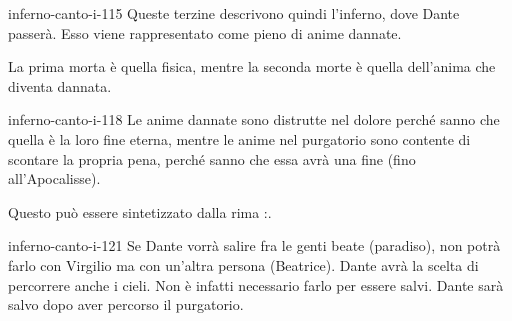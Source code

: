 \documentclass[preview]{standalone}
\begin{document}
\begin{snippet}{inferno-canto-i-115}
    Queste terzine descrivono quindi l'inferno, dove Dante passerà.
    Esso viene rappresentato come pieno di anime dannate.
    
    La prima morta è quella fisica, mentre la seconda morte è quella dell'anima che
    diventa dannata.
\end{snippet}

\begin{snippet}{inferno-canto-i-118}
    Le anime dannate sono distrutte nel dolore perché sanno che quella è la loro
    fine eterna, mentre le anime nel purgatorio sono contente di scontare la propria pena,
    perché sanno che essa avrà una fine (fino all'Apocalisse).

    Questo può essere sintetizzato dalla rima :.
\end{snippet}    

\begin{snippet}{inferno-canto-i-121}
    Se Dante vorrà salire fra le genti beate (paradiso), non potrà farlo con Virgilio
    ma con un'altra persona (Beatrice).
    Dante avrà la scelta di percorrere anche i cieli. Non è infatti necessario
    farlo per essere salvi. Dante sarà salvo dopo aver percorso il purgatorio.
\end{snippet}
\end{document}
